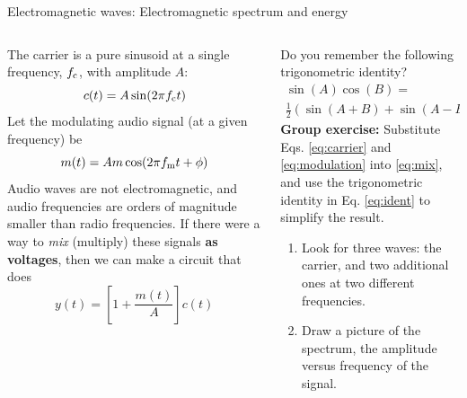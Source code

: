 \documentclass{beamer}
\begin{document}
\begin{frame}{Electromagnetic waves: Electromagnetic spectrum and energy}
\footnotesize
\begin{columns}[T]
\begin{column}{0.5\textwidth}
The carrier is a pure sinusoid at a single frequency, $f_{\rm c}$, with amplitude $A$:
\begin{equation}
c(t) = A\sin(2\pi f_{\rm c} t) \label{eq:carrier}
\end{equation}
Let the modulating audio signal (at a given frequency) be
\begin{equation}
m(t) = Am\cos(2\pi f_{\rm m} t + \phi) \label{eq:modulation}
\end{equation}
Audio waves are not electromagnetic, and audio frequencies are orders of magnitude smaller than radio frequencies.  If there were a way to \textit{mix} (multiply) these signals \textbf{\alert{as voltages}}, then we can make a circuit that does
\begin{equation}
y(t) = \left[1+\frac{m(t)}{A}\right]c(t) \label{eq:mix}
\end{equation}
\end{column}
\begin{column}{0.5\textwidth}
Do you remember the following trigonometric identity?
\begin{multline}
\sin(A)\cos(B) = \\ \frac{1}{2}\left(\sin(A+B) + \sin(A-B)\right) \label{eq:ident}
\end{multline}
\textbf{Group exercise:}
Substitute Eqs. \ref{eq:carrier} and \ref{eq:modulation} into \ref{eq:mix}, and use the trigonometric identity in Eq. \ref{eq:ident} to simplify the result.
\begin{enumerate}
\item Look for three waves: the carrier, and two additional ones at two different frequencies.
\item Draw a picture of the spectrum, the amplitude versus frequency of the signal.
\end{enumerate}
\end{column}
\end{columns}
\end{frame}
\end{document}

